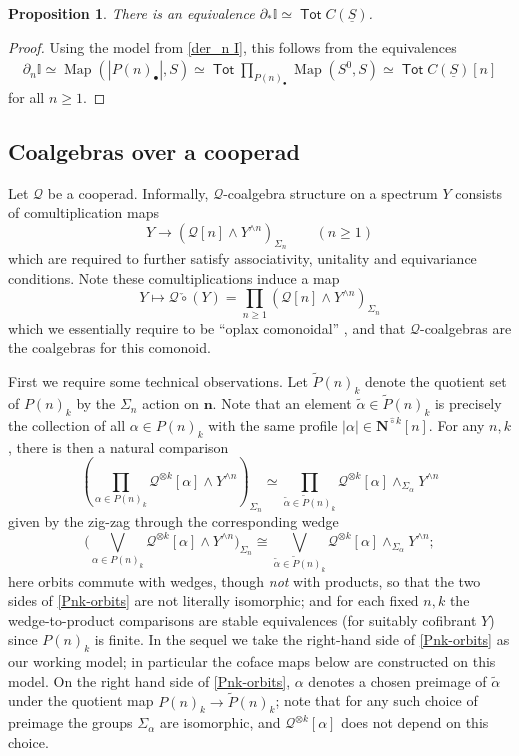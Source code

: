 \documentclass[12pt]{amsart}
\newtheorem{proposition}[subsection]{Proposition}
\theoremstyle{definition}
\theoremstyle{remark}
\newcommand{\Tot}{\operatorname{\mathsf{Tot}}}
\newcommand{\Map}{\operatorname{Map}}
\newcommand{\Id}{\mathbb{I}}
\newcommand{\Cal}[1]{\mathcal{#1}}
\newcommand{\Ncirc}[1]{\mathbf{N}^{\hat{\circ}#1}}
\newcommand{\uS}{\underline{S}}
\newcommand{\ccirc}{\check{\circ}}
\begin{document}
\begin{proposition} \label{prop:model-equiv}
    There is an equivalence $\partial_* \Id\simeq \Tot C(\uS)$.
\end{proposition}

\begin{proof}
    Using the model from \eqref{der_n I}, this follows from the equivalences \begin{align*}
        \partial_n \Id \simeq \Map \left(|P(n)_{\bullet}|, S\right) 
        \simeq \Tot {\prod}_{P(n)_{\bullet}} \Map(S^0, S) 
         \simeq \Tot C(\uS)[n]
    \end{align*} 
    for all $n\geq 1$.
\end{proof}


\subsection{Coalgebras over a cooperad}
Let $\Cal{Q}$ be a cooperad. Informally, $\Cal{Q}$-coalgebra structure on a spectrum $Y$ consists of comultiplication maps \[ Y\to (\Cal{Q}[n] \wedge Y^{\wedge n} )_{\Sigma_n} \quad \quad (n\geq 1)\] which are required to further satisfy associativity, unitality and equivariance conditions. Note these comultiplications induce a map \[ Y\mapsto \Cal{Q}\ccirc (Y)= \prod_{n\geq 1}\left( \mathcal{Q}[n]\wedge Y^{\wedge n}\right)_{\Sigma_n}\] which we essentially require to be ``oplax comonoidal'' \cite{Day-St}, and that $\Cal{Q}$-coalgebras are the coalgebras for this comonoid. 

First we require some technical observations. Let $\widetilde{P}(n)_k$ denote the quotient set of $P(n)_k$ by the $\Sigma_n$ action on $\mathbf{n}$. Note that an element $\widetilde{\alpha} \in \widetilde{P}(n)_k$ is precisely the collection of all $\alpha\in P(n)_k$ with the same profile $|\alpha|\in \Ncirc{k}[n]$. For any $n,k$, there is then a natural comparison \begin{equation} \label{Pnk-orbits}
    \left( \prod_{\alpha\in P(n)_k} \Cal{Q}^{\otimes k}[\alpha]\wedge Y^{\wedge n} \right)_{\Sigma_n}
    \simeq
    \prod_{ \widetilde{\alpha} \in \widetilde{P}(n)_k } \Cal{Q}^{\otimes k}[\alpha] \wedge_{\Sigma_{\alpha}} Y^{ \wedge n}
\end{equation}
given by the zig-zag through the corresponding wedge \[\Big(\bigvee_{\alpha\in P(n)_k} \Cal{Q}^{\otimes k}[\alpha]\wedge Y^{\wedge n}\Big)_{\Sigma_n} \cong \bigvee_{\widetilde{\alpha}\in \widetilde{P}(n)_k} \Cal{Q}^{\otimes k}[\alpha]\wedge_{\Sigma_{\alpha}} Y^{\wedge n};\] here orbits commute with wedges, though \textit{not} with products, so that the two sides of \eqref{Pnk-orbits} are not literally isomorphic; and for each fixed $n,k$ the wedge-to-product comparisons are stable equivalences (for suitably cofibrant $Y$) since $P(n)_k$ is finite. In the sequel we take the right-hand side of \eqref{Pnk-orbits} as our working model; in particular the coface maps below are constructed on this model.
On the right hand side of \eqref{Pnk-orbits}, $\alpha$ denotes a chosen preimage of $\widetilde{\alpha}$ under the quotient map $P(n)_k\to \widetilde{P}(n)_k$; note that for any such choice of preimage the groups $\Sigma_{\alpha}$ are isomorphic, and $\Cal{Q}^{\otimes k}[\alpha]$ does not depend on this choice.
\end{document}
